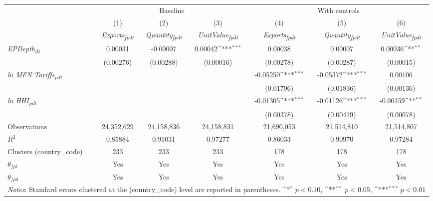 {
\def\sym#1{\ifmmode^{#1}\else\(^{#1}\)\fi}
\begin{tabular}{l*{6}{c}}
\toprule
&\multicolumn{3}{c}{Baseline}&\multicolumn{3}{c}{With controls}\\\cmidrule(lr){2-4}\cmidrule(lr){5-7}
&(1)&(2)&(3)&(4)&(5)&(6)\\
&\textit{Exports\textsubscript{fpdt}}&\textit{Quantity\textsubscript{fpdt}}&\textit{UnitValue\textsubscript{fpdt}}&\textit{Exports\textsubscript{fpdt}}&\textit{Quantity\textsubscript{fpdt}}&\textit{UnitValue\textsubscript{fpdt}}\\
\midrule
\textit{EPDepth\textsubscript{dt}} & 0.00031 & -0.00007 & 0.00042\sym{***} & 0.00038 & 0.00007 & 0.00036\sym{**}\\
 & (0.00276) & (0.00288) & (0.00016) & (0.00278) & (0.00287) & (0.00015)\\
\addlinespace
\textit{ln MFN Tariffs\textsubscript{pdt}} &  &  &  & -0.05250\sym{***} & -0.05372\sym{***} & 0.00106\\
 &  &  &  & (0.01796) & (0.01836) & (0.00136)\\
\addlinespace
\textit{ln HHI\textsubscript{pdt}} &  &  &  & -0.01305\sym{***} & -0.01126\sym{***} & -0.00159\sym{**}\\
 &  &  &  & (0.00378) & (0.00419) & (0.00078)\\
\midrule
Observations & 24,352,629 & 24,158,836 & 24,158,831 & 21,690,053 & 21,514,810 & 21,514,807\\
$R^{2}$ & 0.85884 & 0.91031 & 0.97277 & 0.86033 & 0.90970 & 0.97284\\
Clusters (country_code) & 233 & 233 & 233 & 178 & 178 & 178\\
$\theta_{fpt}$ & Yes & Yes & Yes & Yes & Yes & Yes\\
$\theta_{fpd}$ & Yes & Yes & Yes & Yes & Yes & Yes\\
\bottomrule
\multicolumn{7}{l}{\footnotesize \textit{Notes}: Standard errors clustered at the (country_code) level are reported in parentheses. \sym{*} \(p<0.10\), \sym{**} \(p<0.05\), \sym{***} \(p<0.01\)}\\
\end{tabular}
}
